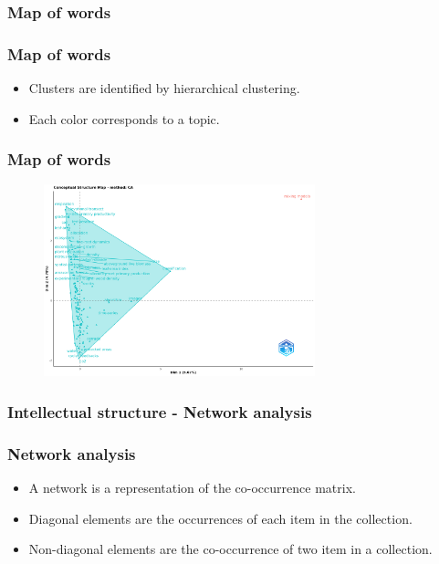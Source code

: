 \documentclass[aspectratio=169]{beamer}
\begin{document}
\subsubsection{Map of words}


\begin{frame}
	\frametitle{Map of words}
	\begin{itemize}
		\item Clusters are identified by hierarchical clustering.
		\item Each color corresponds to a topic.
	\end{itemize}
\end{frame}

\begin{frame}
	\frametitle{Map of words}
	\begin{figure}
		\centering
		\includegraphics[width=0.7\textwidth]{figures/con_stru_map.png}
	\end{figure}
\end{frame}



\subsubsection{Intellectual structure - Network analysis}

\begin{frame}
	\frametitle{Network analysis}
	\begin{itemize}
		\item A network is a representation of the co-occurrence matrix.
		\item Diagonal elements are the occurrences of each item in the collection.
		\item Non-diagonal elements are the co-occurrence of two item in a
		      collection.
	\end{itemize}
\end{frame}
\end{document}
